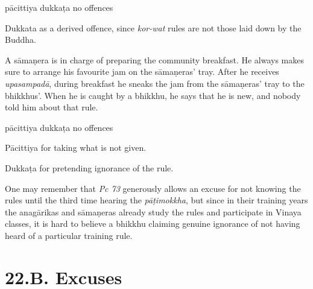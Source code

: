 \begin{exam}{\autoExamName}
\begin{problem*}
\begin{parts}
      \bigskip

      \begin{answers}{3}
        \bChoices
         pācittiya\eAns
         dukkaṭa\eAns
         no offences\eAns
        \eChoices
      \end{answers}

      \begin{solution}
        Dukkata as a derived offence, since \emph{kor-wat} rules are not those laid down by the Buddha.
      \end{solution}

      \bigskip

      \item A sāmaṇera is in charge of preparing the community breakfast. He
      always makes sure to arrange his favourite jam on the sāmaṇeras' tray.
      After he receives \emph{upasampadā}, during breakfast he sneaks the jam
      from the sāmaṇeras' tray to the bhikkhus'. When he is caught by a bhikkhu,
      he says that he is new, and nobody told him about that rule.

      \bigskip

      \begin{answers}{3}
        \bChoices
         pācittiya\eAns
         dukkaṭa\eAns
         no offences\eAns
        \eChoices
      \end{answers}

      \begin{solution}
        Pācittiya for taking what is not given.

        Dukkaṭa for pretending ignorance of the rule.

        One may remember that \emph{Pc 73} generously allows an excuse for not knowing the rules until the third time hearing the \emph{pāṭimokkha}, but since in their training years the anagārikas and sāmaṇeras already study the rules and participate in Vinaya classes, it is hard to believe a bhikkhu claiming genuine ignorance of not having heard of a particular training rule.
      \end{solution}

    \end{parts}

  \end{problem*}

\end{exam}

\chapter{22.B. Excuses}
\renewcommand*{\theChapterTitle}{22.B. Excuses}
